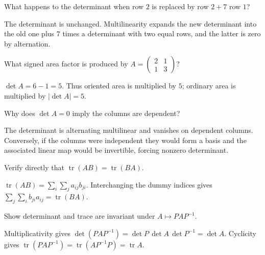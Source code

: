 \begin{problem}\label{prob:i08-problem-02}
What happens to the determinant when row $2$ is replaced by row $2+7$ row $1$?
\end{problem}
\begin{solution}
The determinant is unchanged. Multilinearity expands the new determinant into the old one plus $7$ times a determinant with two equal rows, and the latter is zero by alternation.
\end{solution}

\begin{problem}\label{prob:i08-problem-03}
What signed area factor is produced by $A=\begin{pmatrix}2&1\\1&3\end{pmatrix}$?
\end{problem}
\begin{solution}
$\det A=6-1=5$. Thus oriented area is multiplied by $5$; ordinary area is multiplied by $|\det A|=5$.
\end{solution}

\begin{problem}\label{prob:i08-problem-04}
Why does $\det A=0$ imply the columns are dependent?
\end{problem}
\begin{solution}
The determinant is alternating multilinear and vanishes on dependent columns. Conversely, if the columns were independent they would form a basis and the associated linear map would be invertible, forcing nonzero determinant.
\end{solution}

\begin{problem}\label{prob:i08-problem-05}
Verify directly that $\operatorname{tr}(AB)=\operatorname{tr}(BA)$.
\end{problem}
\begin{solution}
$\operatorname{tr}(AB)=\sum_i\sum_j a_{ij}b_{ji}$. Interchanging the dummy indices gives $\sum_j\sum_i b_{ji}a_{ij}=\operatorname{tr}(BA)$.
\end{solution}

\begin{problem}\label{prob:i08-problem-06}
Show determinant and trace are invariant under $A\mapsto PAP^{-1}$.
\end{problem}
\begin{solution}
Multiplicativity gives $\det(PAP^{-1})=\det P\,\det A\,\det P^{-1}=\det A$. Cyclicity gives $\operatorname{tr}(PAP^{-1})=\operatorname{tr}(AP^{-1}P)=\operatorname{tr}A$.
\end{solution}

